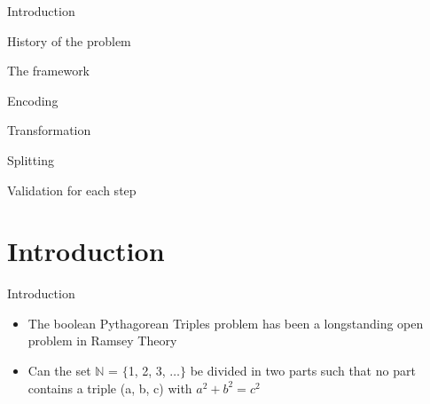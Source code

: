 \documentclass[c,8pt,xcolor...,x11names,usenames,dvipsnames]{beamer}
\author{ Tobias John\\ Aldo Kurmeta\\ Patrick Wienhöft}
\title{\Mytitle}
\subtitle{subtitle}
\institute{TU Dresden}
\date{26th June 2019}
\begin{document}
 
	


  
\begin{frame}
\customtitle
	\begin{list2}
		\item Introduction
		\item History of the problem
		\item The framework
		\item Encoding
		\item Transformation
		\item Splitting 
		\item Validation for each step 
	\end{list2}
\end{frame}




\section{Introduction}

\begin{frame}{Introduction}
	\begin{itemize}
		\item The boolean Pythagorean Triples problem has been a longstanding open problem in Ramsey Theory\pause
		\item Can the set ${\mathbb N}$ = ${\{}$1, 2, 3, ${\dots\}}$ be divided in two parts such that no part contains a triple (a, b, c) with ${a^2 + b^2 = c^2 }$
	\end{itemize}
\end{frame}
\end{document}
